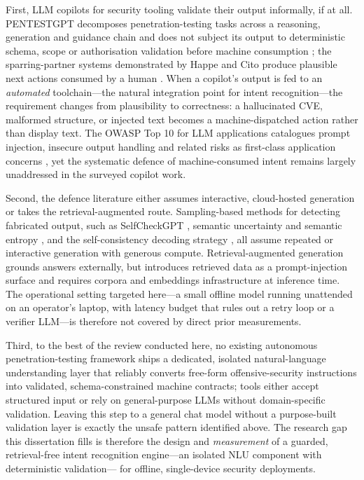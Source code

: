 First, LLM copilots for security tooling validate their output informally, if at
all. PENTESTGPT decomposes penetration-testing tasks across a reasoning,
generation and guidance chain and does not subject its output to deterministic schema, scope
or authorisation validation before machine consumption
\parencite{deng2024pentestgpt}; the sparring-partner systems demonstrated by
Happe and Cito produce plausible next actions consumed by a human
\parencite{happe2023pwned}. When a copilot's output is fed to an
\emph{automated} toolchain---the natural integration point for intent
recognition---the requirement changes from plausibility to correctness: a
hallucinated CVE, malformed structure, or injected text becomes a
machine-dispatched action rather than display text. The OWASP Top 10 for LLM
applications catalogues prompt injection, insecure output handling and related
risks as first-class application concerns \parencite{owasp2025}, yet the
systematic defence of machine-consumed intent remains largely unaddressed in the
surveyed copilot work.

Second, the defence literature either assumes interactive, cloud-hosted
generation or takes the retrieval-augmented route. Sampling-based methods for
detecting fabricated output, such as SelfCheckGPT \parencite{manakul2023selfcheckgpt},
semantic uncertainty \parencite{kuhn2023semantic} and semantic entropy
\parencite{farquhar2024semantic}, and the self-consistency decoding strategy
\parencite{wang2023selfconsistency}, all assume repeated or interactive
generation with generous compute. Retrieval-augmented generation
\parencite{lewis2020rag} grounds answers externally, but introduces retrieved
data as a prompt-injection surface \parencite{greshake2023indirect} and requires
corpora and embeddings infrastructure at inference time. The operational setting
targeted here---a small offline model running unattended on an operator's
laptop, with latency budget that rules out a retry loop or a verifier LLM---is
therefore not covered by direct prior measurements.

Third, to the best of the review conducted here, no existing
autonomous penetration-testing framework ships a dedicated, isolated
natural-language understanding layer that reliably converts free-form
offensive-security instructions into validated, schema-constrained machine contracts; tools either accept structured input or
rely on general-purpose LLMs without domain-specific validation. Leaving this
step to a general chat model without a purpose-built validation layer is exactly
the unsafe pattern identified above. The research gap this dissertation fills is
therefore the design and \emph{measurement} of a guarded, retrieval-free intent
recognition engine---an isolated NLU component with deterministic validation---
for offline, single-device security deployments.

